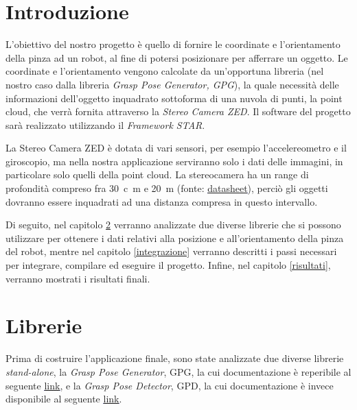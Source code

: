 \documentclass{report}
\begin{document}
\chapter{Introduzione}
L'obiettivo del nostro progetto è quello di fornire le coordinate e l'orientamento della pinza ad un robot, al fine di potersi posizionare per afferrare un oggetto. Le coordinate e l'orientamento vengono calcolate da un'opportuna libreria (nel nostro caso dalla libreria \textit{Grasp Pose Generator, GPG}), la quale necessità delle informazioni dell'oggetto inquadrato sottoforma di una nuvola di punti, la point cloud, che verrà fornita attraverso la \textit{Stereo Camera ZED}. Il software del progetto sarà realizzato utilizzando il \textit{Framework STAR}. \par
La Stereo Camera ZED è dotata di vari sensori, per esempio l'accelereometro e il giroscopio, ma nella nostra applicazione serviranno solo i dati delle immagini, in particolare solo quelli della point cloud. La stereocamera ha un range di profondità compreso fra \SI{30}{c\meter} e \SI{20}{\meter} (fonte: \textcolor{blue}{\underline{\href{https://www.stereolabs.com/assets/datasheets/zed2-camera-datasheet.pdf}{datasheet}}}), perciò gli oggetti dovranno essere inquadrati ad una distanza compresa in questo intervallo. \par
Di seguito, nel capitolo \ref{librerie} verranno analizzate due diverse librerie che si possono utilizzare per ottenere i dati relativi alla posizione e all'orientamento della pinza del robot, mentre nel capitolo \ref{integrazione} verranno descritti i passi necessari per integrare, compilare ed eseguire il progetto. Infine, nel capitolo \ref{risultati}, verranno mostrati i risultati finali.
\newpage
\chapter{Librerie}\label{librerie}
Prima di costruire l'applicazione finale, sono state analizzate due diverse librerie \textit{stand-alone}, la \textit{Grasp Pose Generator}, GPG, la cui documentazione è reperibile al seguente \textcolor{blue}{\underline{\href{https://github.com/atenpas/gpg}{link}}}, e la \textit{Grasp Pose Detector}, GPD, la cui documentazione è invece disponibile al seguente \textcolor{blue}{\underline{\href{https://github.com/atenpas/gpd}{link}}}.\par
{}
\end{document}
